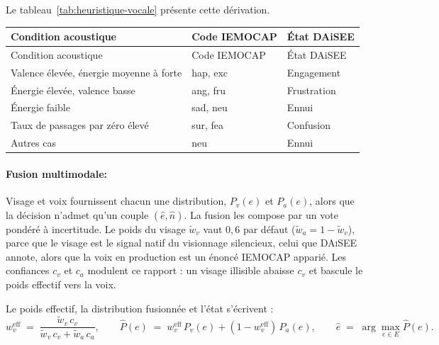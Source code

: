 Le tableau~\ref{tab:heuristique-vocale} présente cette dérivation.

{\small
\renewcommand{\arraystretch}{1.18}
\setlength{\tabcolsep}{4pt}
\begin{xltabular}{\textwidth}{|>{\raggedright\arraybackslash}X|l|l|}
\hline
{}
Condition acoustique & Code IEMOCAP & État DAiSEE \\
\hline
\endfirsthead
\hline
{}
Condition acoustique & Code IEMOCAP & État DAiSEE \\
\hline
\endhead
\endfoot
\endlastfoot
Valence élevée, énergie moyenne à forte & hap, exc & Engagement \\
\hline
Énergie élevée, valence basse & ang, fru & Frustration \\
\hline
Énergie faible & sad, neu & Ennui \\
\hline
Taux de passages par zéro élevé & sur, fea & Confusion \\
\hline
Autres cas & neu & Ennui \\
\hline
\end{xltabular}
\label{tab:heuristique-vocale}
}


\paragraph{Fusion multimodale:}
\label{subsec:fusion-math}

Visage et voix fournissent chacun une distribution, $P_v(e)$ et
$P_a(e)$, alors que la décision n'admet qu'un couple
$(\hat{e}, \hat{n})$. La fusion les compose par un vote pondéré à
incertitude. Le poids du visage $\tilde{w}_v$ vaut $0{,}6$ par défaut
($\tilde{w}_a = 1 - \tilde{w}_v$), parce que le visage est le signal
natif du visionnage silencieux, celui que \textsc{DAiSEE} annote,
alors que la voix en production est un énoncé \textsc{IEMOCAP}
apparié. Les confiances $c_v$ et $c_a$ modulent ce rapport : un
visage illisible abaisse $c_v$ et bascule le poids effectif vers la
voix.

 Le poids effectif, la distribution fusionnée
et l'état s'écrivent :
\begin{equation}
  w_v^{\mathrm{eff}}
  \;=\;
  \frac{\tilde{w}_v\, c_v}{\tilde{w}_v\, c_v + \tilde{w}_a\, c_a},
  \qquad
  \hat{P}(e)
  \;=\;
  w_v^{\mathrm{eff}}\, P_v(e)
  + (1-w_v^{\mathrm{eff}})\, P_a(e),
  \qquad
  \hat{e} \;=\; \arg\max_{e \in E} \hat{P}(e).
  \label{eq:vote}
\end{equation}

